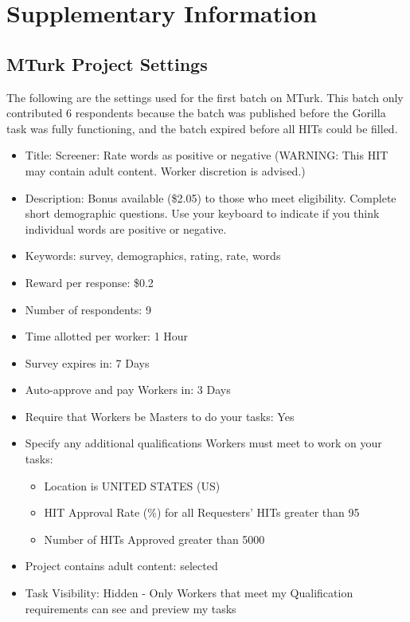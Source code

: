 \documentclass[man]{apa6}
\providecommand{\tightlist}{%
  \setlength{\itemsep}{0pt}\setlength{\parskip}{0pt}}
\begin{document}
\hypertarget{supplementary-information}{%
\section{Supplementary Information}\label{supplementary-information}}

\hypertarget{mturk-project-settings}{%
\subsection{MTurk Project Settings}\label{mturk-project-settings}}

The following are the settings used for the first batch on MTurk. This batch only contributed 6 respondents because the batch was published before the Gorilla task was fully functioning, and the batch expired before all HITs could be filled.

\begin{itemize}
\tightlist
\item
  Title: Screener: Rate words as positive or negative (WARNING: This HIT may contain adult content. Worker discretion is advised.)\\
\item
  Description: Bonus available (\$2.05) to those who meet eligibility. Complete short demographic questions. Use your keyboard to indicate if you think individual words are positive or negative.
\item
  Keywords: survey, demographics, rating, rate, words
\item
  Reward per response: \$0.2
\item
  Number of respondents: 9
\item
  Time allotted per worker: 1 Hour
\item
  Survey expires in: 7 Days
\item
  Auto-approve and pay Workers in: 3 Days
\item
  Require that Workers be Masters to do your tasks: Yes
\item
  Specify any additional qualifications Workers must meet to work on your tasks:

  \begin{itemize}
  \tightlist
  \item
    Location is UNITED STATES (US)
  \item
    HIT Approval Rate (\%) for all Requesters' HITs greater than 95
  \item
    Number of HITs Approved greater than 5000
  \end{itemize}
\item
  Project contains adult content: selected
\item
  Task Visibility: Hidden - Only Workers that meet my Qualification requirements can see and preview my tasks
\end{itemize}
\end{document}
